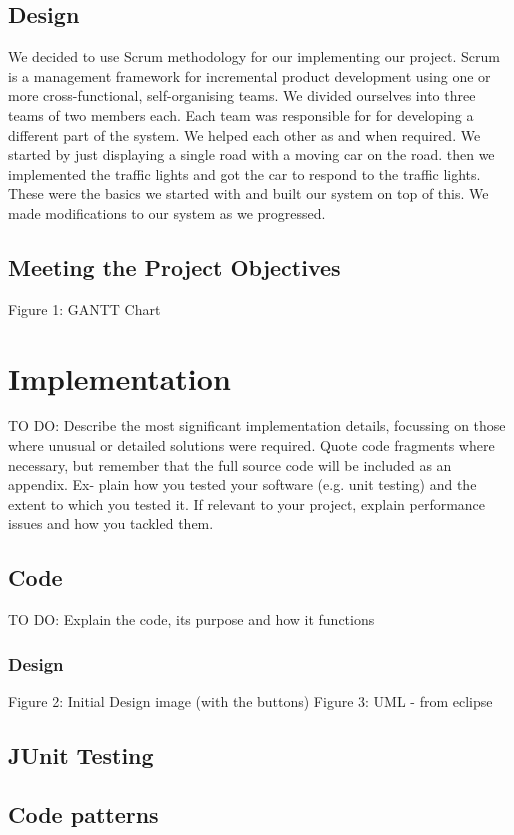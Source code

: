 \documentclass{article} \usepackage{graphicx}
\begin{document}
			 \subsection{Design}
			 We decided to use Scrum methodology for our implementing our project. Scrum is a management framework for incremental product development using one or more cross-functional, self-organising teams. 
			 We divided ourselves into three teams of two members each. Each team was responsible for for developing a different part of the system. We helped each other as and when required.
			  We started by just displaying a single road with a moving car on the road. then we implemented the traffic lights and got the car to respond to the traffic lights. These were the basics we started with and built our system on top of this. We made modifications to our system as we progressed. 	 
		 \subsection{Meeting the Project Objectives} 
		 	Figure 1: GANTT Chart
	\section{Implementation}
		TO DO: Describe the most significant implementation details, focussing on those where unusual or detailed solutions were required. Quote code fragments where necessary, but remember that the full source code will be included as an appendix. Ex- plain how you tested your software (e.g. unit testing) and the extent to which you tested it. If relevant to your project, explain performance issues and how you tackled them.
		\subsection{Code}
			TO DO: Explain the code, its purpose and how it functions
			\subsubsection{Design}
			 	Figure 2: Initial Design image (with the buttons)
				Figure 3: UML - from eclipse
		\subsection{JUnit Testing}
	 	\subsection{Code patterns}
\end{document}
